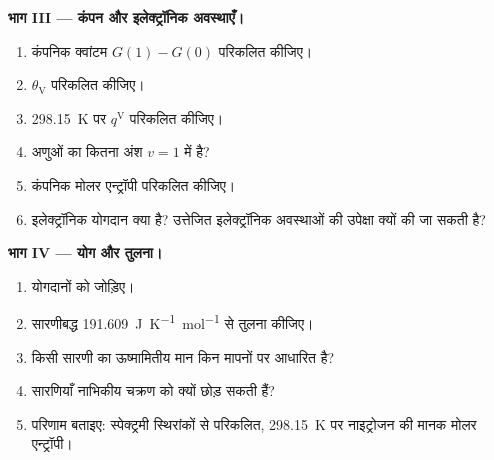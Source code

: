 \begin{problem}
\medskip\noindent\textbf{भाग III --- कंपन और इलेक्ट्रॉनिक अवस्थाएँ।}
\begin{enumerate}[resume]
  \item कंपनिक क्वांटम $G(1) - G(0)$ परिकलित कीजिए।
  \item $\theta_{\mathrm V}$ परिकलित कीजिए।
  \item \qty{298.15}{K} पर $q^{\mathrm V}$ परिकलित कीजिए।
  \item अणुओं का कितना अंश $v = 1$ में है?
  \item कंपनिक मोलर एन्ट्रॉपी परिकलित कीजिए।
  \item इलेक्ट्रॉनिक योगदान क्या है? उत्तेजित इलेक्ट्रॉनिक अवस्थाओं की उपेक्षा क्यों
        की जा सकती है?
\end{enumerate}

\medskip\noindent\textbf{भाग IV --- योग और तुलना।}
\begin{enumerate}[resume]
  \item योगदानों को जोड़िए।
  \item सारणीबद्ध \qty{191.609}{J.K^{-1}.mol^{-1}} से तुलना कीजिए।
  \item किसी सारणी का ऊष्मामितीय मान किन मापनों पर आधारित है?
  \item सारणियाँ नाभिकीय चक्रण को क्यों छोड़ सकती हैं?
  \item परिणाम बताइए: स्पेक्ट्रमी स्थिरांकों से परिकलित, \qty{298.15}{K} पर नाइट्रोजन की
        मानक मोलर एन्ट्रॉपी।
\end{enumerate}
\end{problem}
